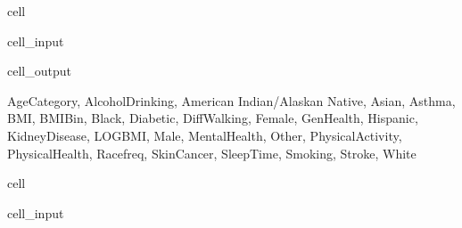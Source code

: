 \documentclass[letterpaper,10pt,english]{jupyterBook}
\begin{document}
\begin{sphinxuseclass}{cell}\begin{sphinxVerbatimInput}

\begin{sphinxuseclass}{cell_input}
\begin{sphinxVerbatim}[commandchars=\\\{\}]
\end{sphinxVerbatim}

\end{sphinxuseclass}\end{sphinxVerbatimInput}
\begin{sphinxVerbatimOutput}

\begin{sphinxuseclass}{cell_output}
\begin{sphinxVerbatim}[commandchars=\\\{\}]
\PYGZob{}\PYGZsq{}AgeCategory\PYGZsq{},
 \PYGZsq{}AlcoholDrinking\PYGZsq{},
 \PYGZsq{}American Indian/Alaskan Native\PYGZsq{},
 \PYGZsq{}Asian\PYGZsq{},
 \PYGZsq{}Asthma\PYGZsq{},
 \PYGZsq{}BMI\PYGZsq{},
 \PYGZsq{}BMI\PYGZus{}Bin\PYGZsq{},
 \PYGZsq{}Black\PYGZsq{},
 \PYGZsq{}Diabetic\PYGZsq{},
 \PYGZsq{}DiffWalking\PYGZsq{},
 \PYGZsq{}Female\PYGZsq{},
 \PYGZsq{}GenHealth\PYGZsq{},
 \PYGZsq{}Hispanic\PYGZsq{},
 \PYGZsq{}KidneyDisease\PYGZsq{},
 \PYGZsq{}LOG\PYGZus{}BMI\PYGZsq{},
 \PYGZsq{}Male\PYGZsq{},
 \PYGZsq{}MentalHealth\PYGZsq{},
 \PYGZsq{}Other\PYGZsq{},
 \PYGZsq{}PhysicalActivity\PYGZsq{},
 \PYGZsq{}PhysicalHealth\PYGZsq{},
 \PYGZsq{}Race\PYGZus{}freq\PYGZsq{},
 \PYGZsq{}SkinCancer\PYGZsq{},
 \PYGZsq{}SleepTime\PYGZsq{},
 \PYGZsq{}Smoking\PYGZsq{},
 \PYGZsq{}Stroke\PYGZsq{},
 \PYGZsq{}White\PYGZsq{}\PYGZcb{}
\end{sphinxVerbatim}

\end{sphinxuseclass}\end{sphinxVerbatimOutput}

\end{sphinxuseclass}
\begin{sphinxuseclass}{cell}\begin{sphinxVerbatimInput}

\begin{sphinxuseclass}{cell_input}
\begin{sphinxVerbatim}[commandchars=\\\{\}]
  
\end{sphinxVerbatim}

\end{sphinxuseclass}\end{sphinxVerbatimInput}

\end{sphinxuseclass}
\sphinxstepscope
\end{document}
